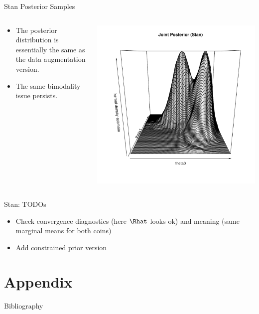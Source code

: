 \documentclass[dvipdfmx,bigger,aspectratio=169]{beamer}
\begin{document}
\begin{frame}[label={sec:org7d371c4}]{Stan Posterior Samples}
\begin{columns}
\begin{column}{0.50\columnwidth}
\begin{itemize}
\item The posterior distribution is essentially the same as the data augmentation version.
\item The same bimodality issue persists.
\end{itemize}
\end{column}

\begin{column}{0.50\columnwidth}
\scriptsize
\begin{center}
\includegraphics[page=1,keepaspectratio,width=\textwidth,height=\textheight]{./source/figure_stan.pdf}
\end{center}
\normalsize
\end{column}
\end{columns}
\end{frame}

\begin{frame}[label={sec:org3510b49}]{Stan: TODOs}
\begin{itemize}
\item Check convergence diagnostics (here \(\Rhat\) looks ok) and meaning (same marginal means for both coins)
\item Add constrained prior version
\end{itemize}
\end{frame}

\section{Appendix}
\label{sec:orga5ab6a0}
\appendix
\begin{frame}[allowframebreaks,label=,t]{Bibliography}
\tiny

\renewcommand{\section}[2]{}



\end{frame}
\end{document}
